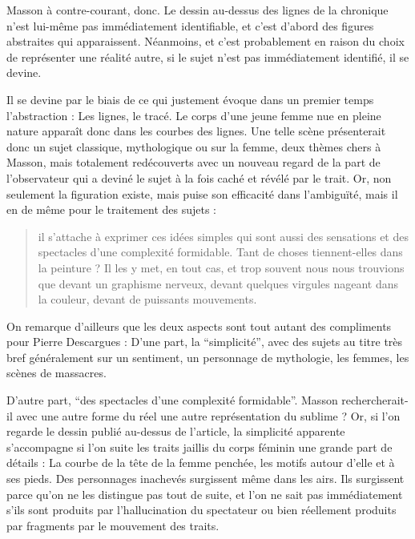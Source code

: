 {	 Masson à contre-courant, donc. Le dessin au-dessus des lignes de la chronique n’est lui-même pas immédiatement identifiable, et c’est d’abord des figures abstraites qui apparaissent. Néanmoins, et c’est probablement en raison du choix de représenter une réalité autre, si le sujet n’est pas immédiatement identifié, il se devine. 

Il se devine par le biais de ce qui justement évoque dans un premier temps l’abstraction : Les lignes, le tracé. Le corps d’une jeune femme nue en pleine nature apparaît donc dans les courbes des lignes. Une telle scène présenterait donc un sujet classique, mythologique ou sur la femme, deux thèmes chers à Masson, mais totalement redécouverts avec un nouveau regard de la part de l’observateur qui a deviné le sujet à la fois caché et révélé par le trait. Or, non seulement la figuration existe, mais puise son efficacité dans l’ambiguïté, mais il en de même pour le traitement des sujets : 

\begin{quote}
il s’attache à exprimer ces idées simples qui sont aussi des sensations et des spectacles d’une complexité formidable. Tant de choses tiennent-elles dans la peinture ? Il les y met, en tout cas, et trop souvent nous nous trouvions que devant un graphisme nerveux, devant quelques virgules nageant dans la couleur, devant de puissants mouvements.  	
\end{quote}
 
	On remarque d’ailleurs que les deux aspects sont tout autant des compliments pour Pierre Descargues : D’une part, la \enquote{simplicité}, avec des sujets au titre très bref généralement sur un sentiment, un personnage de mythologie, les femmes, les scènes de massacres. 


	D’autre part, \enquote{des spectacles d’une complexité formidable}. Masson rechercherait-il avec une autre forme du réel une autre représentation du sublime ?  Or, si l’on regarde le dessin publié au-dessus de l’article, la simplicité apparente s’accompagne si l’on suite les traits jaillis du corps féminin une grande part de détails : La courbe de la tête de la femme penchée, les motifs autour d’elle et à ses pieds. Des personnages inachevés surgissent même dans les airs. Ils surgissent parce qu’on ne les distingue pas tout de suite, et l’on ne sait pas immédiatement s’ils sont produits par l’hallucination du spectateur ou bien réellement produits par fragments par le mouvement des traits. 

}

